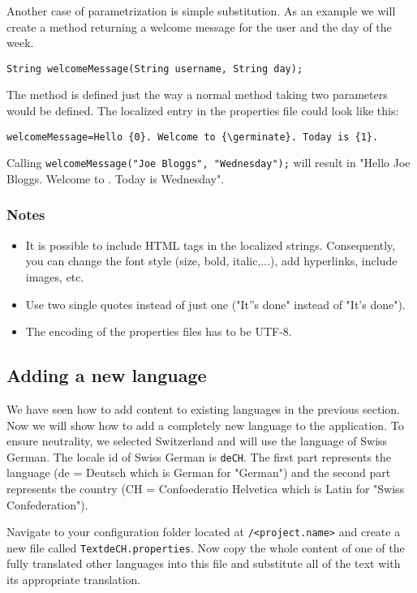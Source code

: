 Another case of parametrization is simple substitution. As an example we will create a method returning a welcome message for the user and the day of the week.

\begin{lstlisting}[style=Java]
String welcomeMessage(String username, String day);
\end{lstlisting}
\noindent
The method is defined just the way a normal method taking two parameters would be defined. The localized entry in the properties file could look like this:

\begin{lstlisting}[style=Properties]
welcomeMessage=Hello {0}. Welcome to {\germinate}. Today is {1}.
\end{lstlisting}
\noindent
Calling \texttt{welcomeMessage("Joe Bloggs", "Wednesday");} will result in "Hello Joe Bloggs. Welcome to {\germinate}. Today is Wednesday".

\subsubsection{Notes}
\begin{itemize}
    \item It is possible to include HTML tags in the localized strings. Consequently, you can change the font style (size, bold, italic,...), add hyperlinks, include images, etc.
    \item Use two single quotes instead of just one (\eg "It''s done" instead of "It's done").
    \item The encoding of the properties files has to be UTF-8.
\end{itemize}

\subsection{Adding a new language}
\label{sec:i18n}
We have seen how to add content to existing languages in the previous section. Now we will show how to add a completely new language to the application. To ensure neutrality, we selected Switzerland and will use the language of Swiss German. The locale id of Swiss German is \texttt{de\textunderscore CH}. The first part represents the language (de = Deutsch which is German for "German") and the second part represents the country (CH = Confoederatio Helvetica which is Latin for "Swiss Confederation").

Navigate to your configuration folder located at \instanceStuff\texttt{/<project.name>} and create a new file called \texttt{Text\textunderscore de\textunderscore CH.properties}. Now copy the whole content of one of the fully translated other languages into this file and substitute all of the text with its appropriate translation.

